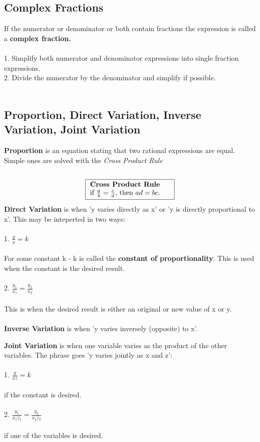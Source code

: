 \subsection{Complex Fractions}
If the numerator or denominator or both contain fractions the expression is called a \textbf{complex fraction.}\\
\\
1. Simplify both numerator and denominator expressions into single fraction expressions.\\
2. Divide the numerator by the denominator and simplify if possible.\\
\\

\subsection{Proportion, Direct Variation, Inverse Variation, Joint Variation}
\textbf{Proportion} is an equation stating that two rational expressions are equal. Simple ones are solved with the \textit{Cross Product Rule}\\
\\
\[
\fbox{
    \parbox{4cm}{ %
        \textbf{Cross Product Rule} \\ 
        if $\frac{a}{b} = \frac{c}{d}$, then $ad = bc$.
    }
}
\]
\textbf{Direct Variation} is when 'y varies directly as x' or 'y is directly proportional to x'. This may be inteperted in two ways:\\
\\
1. $\frac{y}{x} = k $ \\
\\
For some constant k - k is called the \textbf{constant of proportionality}. This is used when the constant is the desired result.\\
\\
2. $\frac{y_1}{x_1} = \frac{y_2}{x_2}$ \\
\\
This is when the desired result is either an original or new value of x or y.\\
\\

\textbf{Inverse Variation} is when 'y varies inversely (opposite) to x'.

\textbf{Joint Variation} is when one variable varies as the product of the other variables. The phrase goes 'y varies jointly as x and z':\\
\\
1. $\frac{y}{xz} = k$ \\
\\
if the constant is desired.\\
\\
2. $\frac{y_1}{x_1z_1} = \frac{y_2}{x_2z_2}$\\
\\
if one of the variables is desired.\\
\\

